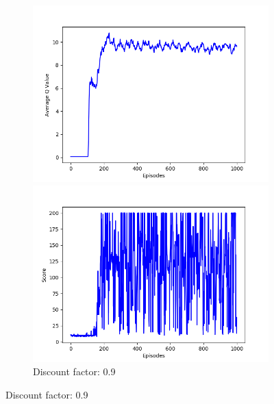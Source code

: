 \documentclass{article}
\begin{document}
\begin{figure}[!htbp]
  \begin{subfigure}{\textwidth}
    \begin{minipage}{0.5\textwidth}
      \centering
      \includegraphics[scale=0.45]{../experiments/discount_factor_09/qvalues.png}
    \end{minipage}
    \begin{minipage}{0.5\textwidth}
      \centering
      \includegraphics[scale=0.45]{../experiments/discount_factor_09/scores.png}
    \end{minipage}
    \caption{Discount factor: 0.9}
  \end{subfigure}%


\end{figure}
\end{document}
